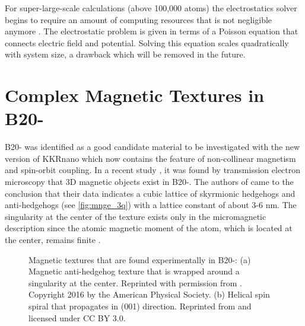 \documentclass[graybox]{svmult}
\begin{document}
For super-large-scale calculations (above 100,000 atoms) the electrostatics solver begins
to require an amount of computing resources that is not negligible anymore \cite{brommel_juqueen_2017}. 
The electrostatic problem is given in terms of a Poisson equation that connects electric field and potential. 
Solving this equation scales quadratically with system size, a drawback which will be removed in the future.

\section{Complex Magnetic Textures in B20-}
\label{sec:mnge}

B20- was identified as a good candidate material to be investigated with the new
version of KKRnano which now contains the feature of non-collinear magnetism and spin-orbit coupling.
In a recent study \cite{tanigaki_real-space_2015}, it was 
found by transmission electron microscopy that 3D magnetic
objects exist in B20-. The authors of \cite{tanigaki_real-space_2015}
came to the conclusion that their data indicates a
cubic lattice of skyrmionic hedgehogs
and anti-hedgehogs (see \cref{fig:mnge_3q}) 
with a lattice constant of about 3-6 nm.
The singularity at the center of the texture exists only in the micromagnetic description since the
atomic magnetic moment of the atom, which is located at the center,
remains finite \cite{feldtkeller_continuous_2017}.
\begin{figure}[htb]
	\hfill
	\hfill
 \caption{Magnetic textures that are found experimentally in B20-: (a) 
	Magnetic anti-hedgehog texture that is wrapped around a singularity at the center.
	Reprinted with permission from \cite{zhang_electric_2016}. Copyright 2016 by
	the American Physical Society. (b) Helical
	spin spiral that propagates in (001) direction. Reprinted from \cite{rybakov_new_2016} and
	licensed under CC BY 3.0.}
\end{figure}
\end{document}
